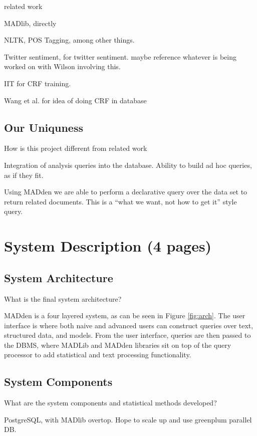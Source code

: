 \documentclass{article}
\newcommand{\system}{MADden\xspace}
\begin{document}
\begin{enumerate}
  related work

  MADlib, directly

  NLTK, POS Tagging, among other things.

  Twitter sentiment, for twitter sentiment. maybe reference whatever is being worked on with Wilson involving this.

  IIT for CRF training.

  Wang et al. for idea of doing CRF in database

  \subsection{Our Uniquness}
  How is this project different from related work

  Integration of analysis queries into the database.
  Ability to build ad hoc queries, as if they fit.

  Using {\system} we are able to perform a declarative query over the data set to return related documents.
  This is a ``what we want, not how to get it'' style query.

  \section{System Description (4 pages)}
  \subsection{System Architecture}
  What is the final system architecture?

  {\system} is a four layered system, as can be seen in Figure \ref{fig:arch}.
  The user interface is where both naive and advanced users can construct queries over text, structured data, and models.
  From the user interface,
  queries are then passed to the DBMS,
  where MADLib and {\system} libraries sit on top of the query processor to add statistical and text processing functionality.


  \subsection{System Components}
  What are the system components and statistical methods developed?

  PostgreSQL, with MADlib overtop.
  Hope to scale up and use greenplum parallel DB.


\end{enumerate}
\end{document}
